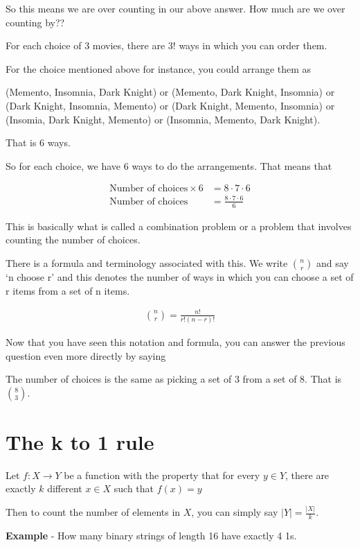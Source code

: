 \documentclass[12pt]{article}
\begin{document}
So this means we are over counting in our above answer. How much are we over counting by??

For each choice of 3 movies, there are 3! ways in which you can order them. 

For the choice mentioned above for instance, you could arrange them as

(Memento, Insomnia, Dark Knight) or (Memento, Dark Knight, Insomnia) or (Dark Knight, Insomnia, Memento) or (Dark Knight, Memento, Insomnia) or (Insomia, Dark Knight, Memento) or 
(Insomnia, Memento, Dark Knight). 

That is 6 ways.

So for each choice, we have 6 ways to do the arrangements. That means that

\begin{align*}
\text{Number of choices} \times 6 &= 8 \cdot 7 \cdot 6 \\
\text{Number of choices} &= \frac{8 \cdot 7 \cdot 6 }{6}
\end{align*}

This is basically what is called a combination problem or a problem that involves counting the number of choices.

There is a formula and terminology associated with this. We write ${n \choose r}$ and say `n choose r' and this denotes the number of ways in which you can choose a set of r items from a set of n items.

\begin{align*}
{n \choose r} = \frac{n!}{r!(n-r)!}
\end{align*}

Now that you have seen this notation and formula, you can answer the previous question even more directly by saying

The number of choices is the same as picking a set of 3 from a set of 8. That is $\binom{8}{3}$.

\section*{The k to 1 rule}
Let $f: X \rightarrow Y$ be a function with the property that for every $y \in Y$, there are exactly $k$ different $x \in X$ such that $f(x) = y$

Then to count the number of elements in $X$, you can simply say $|Y| = \frac{|X|}{k}$.

\medskip
\textbf{Example} - How many binary strings of length 16 have exactly 4 1s.
\end{document}

